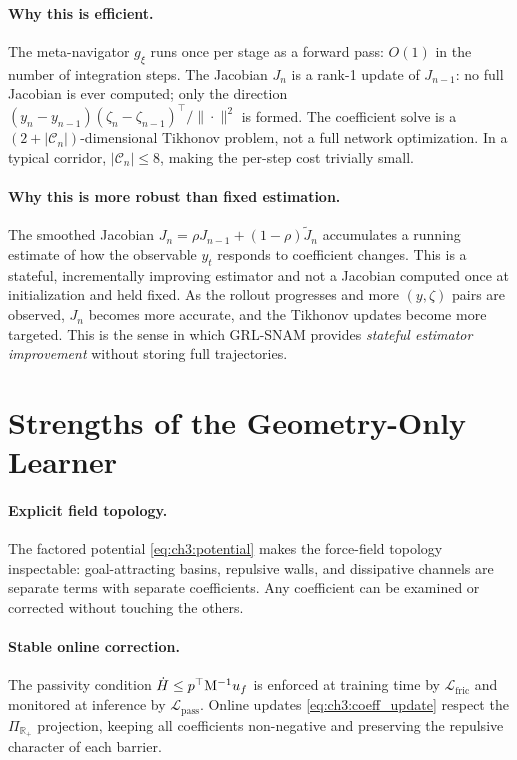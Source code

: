 \paragraph{Why this is efficient.}
The meta-navigator $g_\xi$ runs once per stage as a forward pass:
$O(1)$ in the number of integration steps.
The Jacobian $J_n$ is a rank-1 update of $J_{n-1}$:
no full Jacobian is ever computed; only the direction
$(y_n - y_{n-1})(\zeta_n-\zeta_{n-1})^\top/\|\cdot\|^2$ is formed.
The coefficient solve is a $(2+|\mathcal{C}_n|)$-dimensional
Tikhonov problem, not a full network optimization.
In a typical corridor, $|\mathcal{C}_n| \leq 8$, making the
per-step cost trivially small.

\paragraph{Why this is more robust than fixed estimation.}
The smoothed Jacobian $J_n = \rho J_{n-1} + (1-\rho)\tilde{J}_n$
accumulates a running estimate of how the observable $y_t$ responds
to coefficient changes.
This is a stateful, incrementally improving estimator and not a
Jacobian computed once at initialization and held fixed.
As the rollout progresses and more $(y,\zeta)$ pairs are observed,
$J_n$ becomes more accurate, and the Tikhonov updates become more
targeted.
This is the sense in which GRL-SNAM provides
\emph{stateful estimator improvement} without storing full trajectories.

\section{Strengths of the Geometry-Only Learner}
\label{sec:ch3:strengths}

\paragraph{Explicit field topology.}
The factored potential \eqref{eq:ch3:potential} makes the force-field
topology inspectable: goal-attracting basins, repulsive walls, and
dissipative channels are separate terms with separate coefficients.
Any coefficient can be examined or corrected without touching the others.

\paragraph{Stable online correction.}
The passivity condition $\dot{H} \leq p^\top\mathrm{M}^{-1}u_f$
is enforced at training time by $\mathcal{L}_{\mathrm{fric}}$
and monitored at inference by $\mathcal{L}_{\mathrm{pass}}$.
Online updates \eqref{eq:ch3:coeff_update} respect the
$\Pi_{\mathbb{R}_+}$ projection, keeping all coefficients
non-negative and preserving the repulsive character of each barrier.

